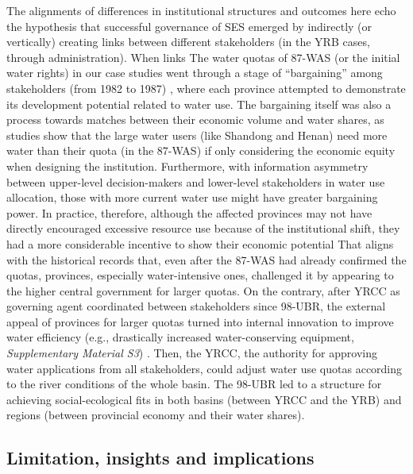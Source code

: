 The alignments of differences in institutional structures and outcomes here echo the hypothesis that successful governance of SES emerged by indirectly (or vertically) creating links between different stakeholders (in the YRB cases, through administration).
When links The water quotas of 87-WAS (or the initial water rights) in our case studies went through a stage of ``bargaining'' among stakeholders (from 1982 to 1987) \cite{wang2019a, wang2019d}, where each province attempted to demonstrate its development potential related to water use.
The bargaining itself was also a process towards matches between their economic volume and water shares, as studies show that the large water users (like Shandong and Henan) need more water than their quota (in the 87-WAS) if only considering the economic equity when designing the institution.
Furthermore, with information asymmetry between upper-level decision-makers and lower-level stakeholders in water use allocation, those with more current water use might have greater bargaining power.
In practice, therefore, although the affected provinces may not have directly encouraged excessive resource use because of the institutional shift, they had a more considerable incentive to show their economic potential
That aligns with the historical records that, even after the 87-WAS had already confirmed the quotas, provinces, especially water-intensive ones, challenged it by appearing to the higher central government for larger quotas.
On the contrary, after YRCC as governing agent coordinated between stakeholders since 98-UBR, the external appeal of provinces for larger quotas turned into internal innovation to improve water efficiency (e.g., drastically increased water-conserving equipment, \textit{Supplementary Material S3})
\cite{krieger1955, ostrom1990}.
Then, the YRCC, the authority for approving water applications from all stakeholders, could adjust water use quotas according to the river conditions of the whole basin.
The 98-UBR led to a structure for achieving social-ecological fits in both basins (between YRCC and the YRB) and regions (between provincial economy and their water shares).

\subsection{Limitation, insights and implications}
\label{discussion-3}

